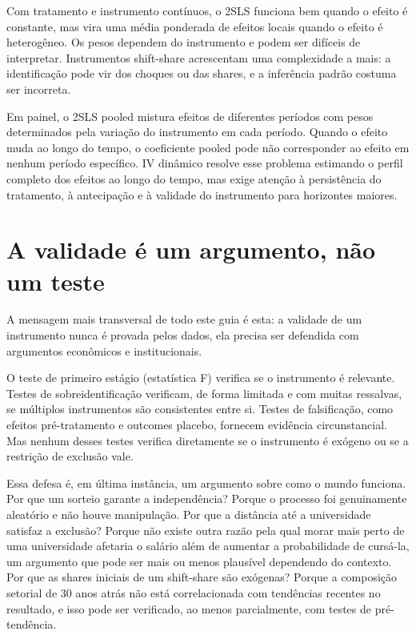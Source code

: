 Com tratamento e instrumento contínuos, o 2SLS funciona bem quando o efeito é constante, mas vira uma média ponderada de efeitos locais quando o efeito é heterogêneo. Os pesos dependem do instrumento e podem ser difíceis de interpretar. Instrumentos shift-share acrescentam uma complexidade a mais: a identificação pode vir dos choques ou das shares, e a inferência padrão costuma ser incorreta.

Em painel, o 2SLS pooled mistura efeitos de diferentes períodos com pesos determinados pela variação do instrumento em cada período. Quando o efeito muda ao longo do tempo, o coeficiente pooled pode não corresponder ao efeito em nenhum período específico. IV dinâmico resolve esse problema estimando o perfil completo dos efeitos ao longo do tempo, mas exige atenção à persistência do tratamento, à antecipação e à validade do instrumento para horizontes maiores.

\section{A validade é um argumento, não um teste}
\label{sec:argumento}

A mensagem mais transversal de todo este guia é esta: a validade de um instrumento nunca é provada pelos dados, ela precisa ser defendida com argumentos econômicos e institucionais.

O teste de primeiro estágio (estatística F) verifica se o instrumento é relevante. Testes de sobreidentificação verificam, de forma limitada e com muitas ressalvas, se múltiplos instrumentos são consistentes entre si. Testes de falsificação, como efeitos pré-tratamento e outcomes placebo, fornecem evidência circunstancial. Mas nenhum desses testes verifica diretamente se o instrumento é exógeno ou se a restrição de exclusão vale.

Essa defesa é, em última instância, um argumento sobre como o mundo funciona. Por que um sorteio garante a independência? Porque o processo foi genuinamente aleatório e não houve manipulação. Por que a distância até a universidade satisfaz a exclusão? Porque não existe outra razão pela qual morar mais perto de uma universidade afetaria o salário além de aumentar a probabilidade de cursá-la, um argumento que pode ser mais ou menos plausível dependendo do contexto. Por que as shares iniciais de um shift-share são exógenas? Porque a composição setorial de 30 anos atrás não está correlacionada com tendências recentes no resultado, e isso pode ser verificado, ao menos parcialmente, com testes de pré-tendência.

